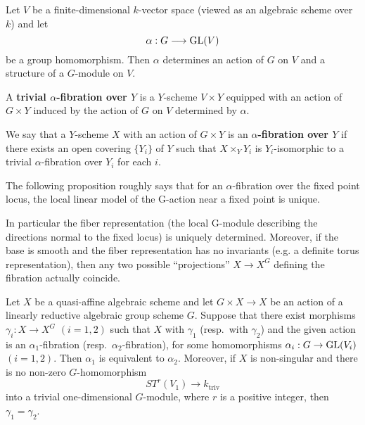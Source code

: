 \documentclass[12pt]{article}
\begin{document}
Let $V$ be a finite-dimensional $k$-vector space (viewed as an algebraic 
scheme over $k$) and let 
\[
  \alpha : G \longrightarrow \operatorname{GL}(V)
\]
be a group homomorphism. Then $\alpha$ determines an action of $G$ on $V$ 
and a structure of a $G$-module on $V$. 

\begin{definition}
   A \textbf{trivial $\alpha$-fibration over $Y$} is a $Y$-scheme $V \times Y$ 
equipped with an action of $G \times Y$ induced by the action of $G$ on $V$ 
determined by $\alpha$.

We say that a $Y$-scheme $X$ with an action of $G \times Y$ is an 
\textbf{$\alpha$-fibration over $Y$} if there exists an open covering 
$\{Y_i\}$ of $Y$ such that $X \times_Y Y_i$ is $Y_i$-isomorphic to a trivial $\alpha$-fibration over $Y_i$ for each $i$.
\end{definition}

The following proposition roughly says that for an $\alpha$-fibration over the fixed point locus, the local linear model of the G-action near a fixed point is unique.

In particular the fiber representation (the local G-module describing the directions normal to the fixed locus) is uniquely determined. Moreover, if the base is smooth and the fiber representation has no invariants (e.g. a definite torus representation), then any two possible “projections” $X \to X^G$ defining the fibration actually coincide.
\begin{proposition}[3.1]
Let $X$ be a quasi-affine algebraic scheme and let $G \times X \to X$ be an action of a linearly reductive algebraic group scheme $G$. Suppose that there exist morphisms $\gamma_i : X \to X^G$ $(i = 1, 2)$ such that $X$ with $\gamma_1$ (resp.\ with $\gamma_2$) and the given action is an $\alpha_1$-fibration (resp.\ $\alpha_2$-fibration), for some homomorphisms $\alpha_i : G \to \operatorname{GL}(V_i)$ $(i = 1, 2)$. Then $\alpha_1$ is equivalent to $\alpha_2$. Moreover, if $X$ is non-singular and there is no non-zero $G$-homomorphism
\[
   ST^r(V_1) \longrightarrow k_{\mathrm{triv}}
\]
into a trivial one-dimensional $G$-module, where $r$ is a positive integer, then $\gamma_1 = \gamma_2$.
\end{proposition}
\end{document}
